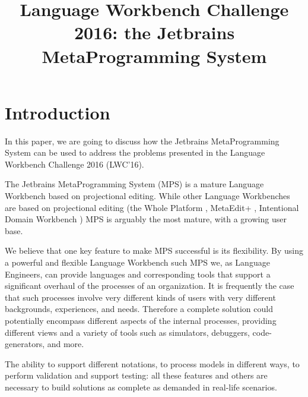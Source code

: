 \documentclass[preprint,numbers,10pt]{sigplanconf}
\begin{document}
\title{Language Workbench Challenge 2016: the Jetbrains MetaProgramming System}


\maketitle

%
%

\section{Introduction}

In this paper, we are going to discuss how the Jetbrains MetaProgramming System can be used to address the problems presented in the Language Workbench Challenge 2016 (LWC'16).

The Jetbrains MetaProgramming System (MPS) is a mature Language Workbench based on projectional editing. While other Language Workbenches are based on projectional editing (the Whole Platform \cite{solmi2005whole}, MetaEdit+ \cite{Tolvanen2006}, Intentional Domain Workbench \cite{Simonyi2006}) MPS is arguably the most mature, with a growing user base.

We believe that one key feature to make MPS successful is its flexibility. By using a powerful and flexible Language Workbench such MPS we, as Language Engineers, can provide languages and corresponding tools that support a significant overhaul of the processes of an organization. It is frequently the case that such processes involve very different kinds of users with very different backgrounds, experiences, and needs. Therefore a complete solution could potentially encompass different aspects of the internal processes, providing different views and a variety of tools such as simulators, debuggers, code-generators, and more.

The ability to support different notations, to process models in different ways, to perform validation and support testing: all these features and others are necessary to build solutions as complete as demanded in real-life scenarios.
\end{document}
